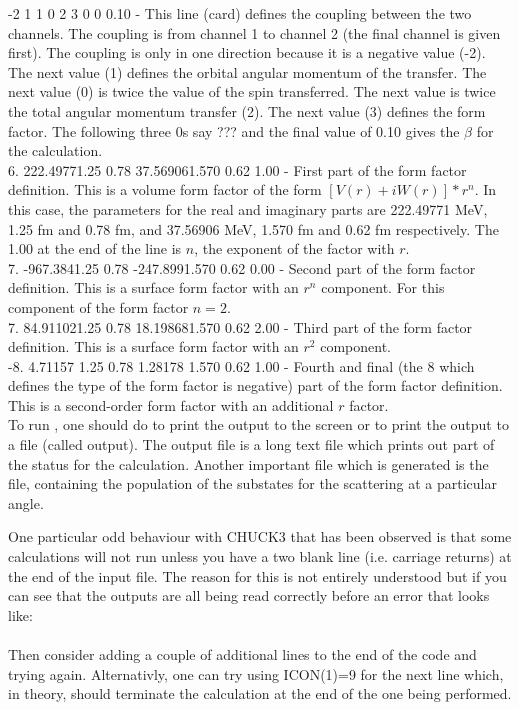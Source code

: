 \documentclass[a4paper,10pt]{article}
\begin{document}
 -2  1  1  0  2  3  0  0 0.10 - This line (card) defines the coupling between the two channels. The coupling is from channel 1 to channel 2 (the final channel is given first). The coupling is only in one direction because it is a negative value (-2). The next value (1) defines the orbital angular momentum of the transfer. The next value (0) is twice the value of the spin transferred. The next value is twice the total angular momentum transfer (2). The next value (3) defines the form factor. The following three 0s say ??? and the final value of 0.10 gives the $\beta$ for the calculation. \\
6.      222.49771.25    0.78            37.569061.570   0.62            1.00 - First part of the form factor definition. This is a volume form factor of the form $[V(r) + iW(r)] * r^n$. In this case, the parameters for the real and imaginary parts are 222.49771 MeV, 1.25 fm and 0.78 fm, and 37.56906 MeV, 1.570 fm and 0.62 fm respectively. The 1.00 at the end of the line is $n$, the exponent of the factor with $r$.\\
7.      -967.3841.25    0.78            -247.8991.570   0.62            0.00 - Second part of the form factor definition. This is a surface form factor with an $r^n$ component. For this component of the form factor $n=2$.\\
7.      84.911021.25    0.78            18.198681.570   0.62            2.00 - Third part of the form factor definition. This is a surface form factor with an $r^2$ component.\\
-8.     4.71157 1.25    0.78            1.28178 1.570   0.62            1.00 - Fourth and final (the 8 which defines the type of the form factor is negative) part of the form factor definition. This is a second-order form factor with an additional $r$ factor.\\

To run , one should do  to print the output to the screen or  to print the output to a file (called output). The output file is a long text file which prints out part of the status for the calculation. Another important file which is generated is the  file, containing the population of the substates for the scattering at a particular angle.

One particular odd behaviour with CHUCK3 that has been observed is that some calculations will not run unless you have a two blank line (i.e. carriage returns) at the end of the input file. The reason for this is not entirely understood but if you can see that the outputs are all being read correctly before an error that looks like:\\ \\ 
Then consider adding a couple of additional lines to the end of the code and trying again. Alternativly, one can try using ICON(1)=9 for the next line which, in theory, should terminate the calculation at the end of the one being performed.
\end{document}
